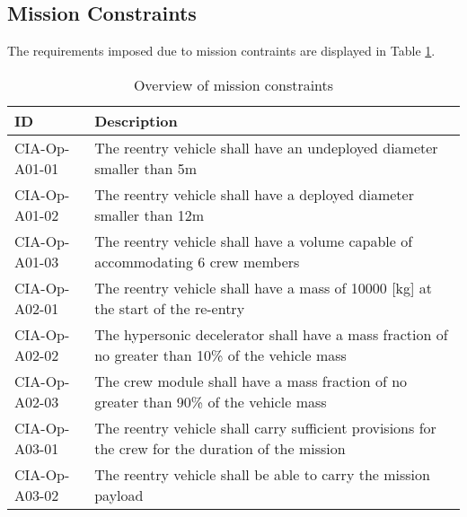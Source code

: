 \subsection{Mission Constraints} \label{sec:MisCon}
The requirements  imposed due to mission contraints are displayed in Table \ref{tab:MissionCon}.
\begin{table}[H]
	\caption{Overview of mission constraints}
	\begin{tabular}{|p{}|p{}|}
    \hline
    ID          & Description                                                                                                      \\ \hline \hline
		CIA-Op-A01-01 & The reentry vehicle shall have an undeployed diameter smaller than 5m                         				            \\ \hline
		CIA-Op-A01-02 & The reentry vehicle shall have a deployed diameter smaller than 12m                         				            \\ \hline
		CIA-Op-A01-03 & The reentry vehicle shall have a volume capable of accommodating 6 crew members                        				            \\ \hline
		CIA-Op-A02-01 & The reentry vehicle shall have a mass of 10000 [kg] at the start of the re-entry                       				            \\ \hline
		CIA-Op-A02-02 & The hypersonic decelerator shall have a mass fraction of no greater than 10\% of the vehicle mass  \\ \hline
		CIA-Op-A02-03 & The crew module shall have a mass fraction of no greater than 90\% of the vehicle mass \\ \hline
		CIA-Op-A03-01 & The reentry vehicle shall carry sufficient provisions for the crew for the duration of the mission \\ \hline
		CIA-Op-A03-02 & The reentry vehicle shall be able to carry the mission payload								\\ \hline	
		\end{tabular}
    \label{tab:MissionCon}
\end{table}